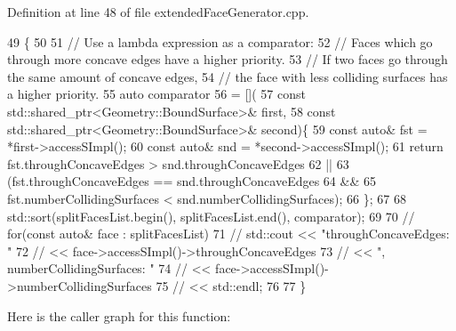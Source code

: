 Definition at line 48 of file extended\+Face\+Generator.\+cpp.


\begin{DoxyCode}
49                                                                        \{
50 
51     \textcolor{comment}{// Use a lambda expression as a comparator:}
52     \textcolor{comment}{// Faces which go through more concave edges have a higher priority.}
53     \textcolor{comment}{// If two faces go through the same amount of concave edges,}
54     \textcolor{comment}{// the face with less colliding surfaces has a higher priority.}
55     \textcolor{keyword}{auto} comparator
56             = [](
57             \textcolor{keyword}{const} std::shared\_ptr<Geometry::BoundSurface>& first,
58             \textcolor{keyword}{const} std::shared\_ptr<Geometry::BoundSurface>& second)\{
59         \textcolor{keyword}{const} \textcolor{keyword}{auto}& fst = *first->accessSImpl();
60         \textcolor{keyword}{const} \textcolor{keyword}{auto}& snd = *second->accessSImpl();
61         \textcolor{keywordflow}{return} fst.throughConcaveEdges > snd.throughConcaveEdges
62                 ||
63                 (fst.throughConcaveEdges == snd.throughConcaveEdges
64                  &&
65                  fst.numberCollidingSurfaces < snd.numberCollidingSurfaces);
66     \};
67 
68     std::sort(splitFacesList.begin(), splitFacesList.end(), comparator);
69 
70 \textcolor{comment}{//    for(const auto& face : splitFacesList)}
71 \textcolor{comment}{//        std::cout << "throughConcaveEdges: "}
72 \textcolor{comment}{//                  << face->accessSImpl()->throughConcaveEdges}
73 \textcolor{comment}{//                  << ", numberCollidingSurfaces: "}
74 \textcolor{comment}{//                  << face->accessSImpl()->numberCollidingSurfaces}
75 \textcolor{comment}{//                  << std::endl;}
76 
77 \}
\end{DoxyCode}
Here is the caller graph for this function\+:
\mbox{\label{classMcCAD_1_1Decomposition_1_1SplitSurfaces_1_1Impl_ac6aa64ac9950feda60c68cd2538c855a}} 
